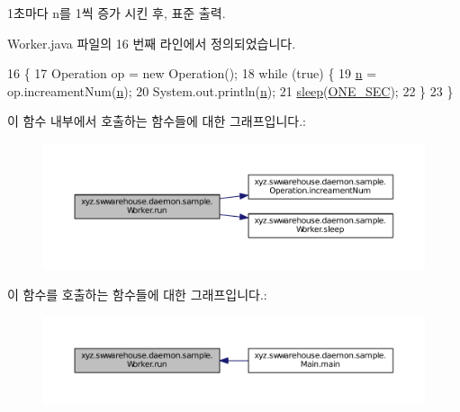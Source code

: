 1초마다 n를 1씩 증가 시킨 후, 표준 출력. 



Worker.\+java 파일의 16 번째 라인에서 정의되었습니다.


\begin{DoxyCode}
16                       \{
17         Operation op = \textcolor{keyword}{new} Operation();
18         \textcolor{keywordflow}{while} (\textcolor{keyword}{true}) \{
19             \hyperlink{classxyz_1_1swwarehouse_1_1daemon_1_1sample_1_1_worker_aba3c26c1febb4e19bfc9562306bcee80}{n} = op.increamentNum(\hyperlink{classxyz_1_1swwarehouse_1_1daemon_1_1sample_1_1_worker_aba3c26c1febb4e19bfc9562306bcee80}{n});
20             System.out.println(\hyperlink{classxyz_1_1swwarehouse_1_1daemon_1_1sample_1_1_worker_aba3c26c1febb4e19bfc9562306bcee80}{n});
21             \hyperlink{classxyz_1_1swwarehouse_1_1daemon_1_1sample_1_1_worker_ae9991783aa9ada529a18ecb5abdb4ad7}{sleep}(\hyperlink{classxyz_1_1swwarehouse_1_1daemon_1_1sample_1_1_worker_a285c9ea5eebf4bb083140ca18048961a}{ONE\_SEC});
22         \}
23     \}
\end{DoxyCode}


이 함수 내부에서 호출하는 함수들에 대한 그래프입니다.\+:\nopagebreak
\begin{figure}[H]
\begin{center}
\leavevmode
\includegraphics[width=350pt]{classxyz_1_1swwarehouse_1_1daemon_1_1sample_1_1_worker_af1bf199e3277a2946e59c7acc5416731_cgraph}
\end{center}
\end{figure}




이 함수를 호출하는 함수들에 대한 그래프입니다.\+:\nopagebreak
\begin{figure}[H]
\begin{center}
\leavevmode
\includegraphics[width=350pt]{classxyz_1_1swwarehouse_1_1daemon_1_1sample_1_1_worker_af1bf199e3277a2946e59c7acc5416731_icgraph}
\end{center}
\end{figure}


